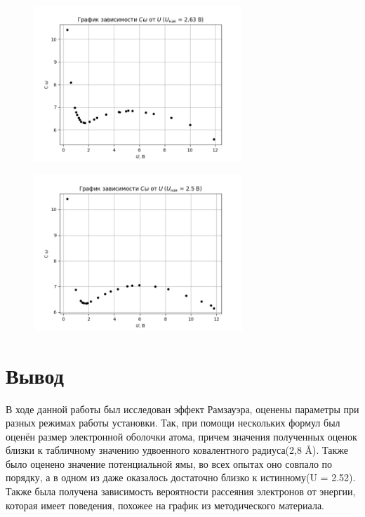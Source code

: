 \documentclass[a4paper,12pt]{article}
\begin{document}
\begin{figure}[H]
\centering
\includegraphics[width = 0.7\textwidth]{graph5.png}
\end{figure}

\begin{figure}[H]
\centering
\includegraphics[width = 0.7\textwidth]{graph6.png}
\end{figure}

\section*{Вывод}
В ходе данной работы был исследован эффект Рамзауэра, оценены параметры при разных режимах работы установки. Так, при помощи нескольких формул был оценён размер электронной оболочки атома, причем значения полученных оценок близки к табличному значению удвоенного ковалентного радиуса(2,8 \AA). Также было оценено значение потенциальной ямы, во всех опытах оно совпало по порядку, а в одном из даже оказалось достаточно близко к истинному(U = 2.52). Также была получена зависимость вероятности рассеяния электронов от энергии, которая имеет поведения, похожее на график из методического материала.
\end{document}
